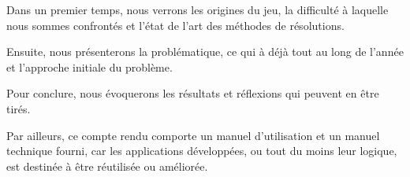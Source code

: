 \documentclass{article}
\begin{document}
	Dans un premier temps, nous verrons les origines du jeu, la difficulté à laquelle nous sommes confrontés et l'état de l'art des méthodes de résolutions.
	
	Ensuite, nous présenterons la problématique, ce qui à déjà tout au long de l'année et l'approche initiale du problème.
	
	Pour conclure, nous évoquerons les résultats et réflexions qui peuvent en être tirés.
	
	Par ailleurs, ce compte rendu comporte un manuel d'utilisation et un manuel technique fourni, car les applications développées, ou tout du moins leur logique, est destinée à être réutilisée ou améliorée.


	\newpage
	

	\newpage
	

	\newpage
	

	\newpage
	
	
	\newpage
	

	\newpage
	
	
	\newpage
	

	

	\printbibliography
\end{document}
